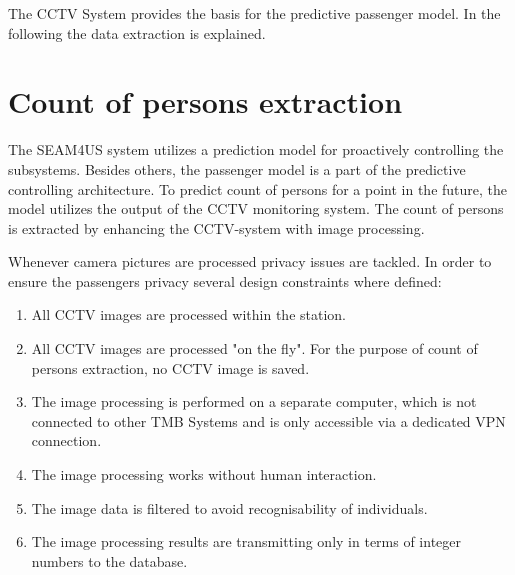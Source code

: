 The CCTV System provides the basis for the predictive passenger model. In the following the data extraction  is explained.


\section{Count of persons extraction}
\label{sec:PassengerDensityDataExtraction}

The SEAM4US system utilizes a prediction model for proactively controlling the subsystems.
Besides others, the passenger model is a part of the predictive controlling architecture.
To predict count of persons for a point in the future, the model utilizes the output of the CCTV monitoring system. 
The count of persons is extracted by enhancing the CCTV-system with image processing.

Whenever camera pictures are processed privacy issues are tackled. In order to ensure the passengers privacy several design constraints where defined:

\begin{enumerate}\setlength{\itemsep}{-2pt}
  \item All CCTV images are processed within the station.
  \item All CCTV images are processed "on the fly". For the purpose of count of persons extraction, no CCTV image is saved.
  \item The image processing is performed on a separate computer, which is not connected to other TMB Systems and is only accessible via a dedicated VPN connection.
  \item The image processing works without human interaction.
  \item The image data is filtered to avoid recognisability of individuals.
  \item The image processing results are transmitting only in terms of integer numbers to the database.
\end{enumerate}

